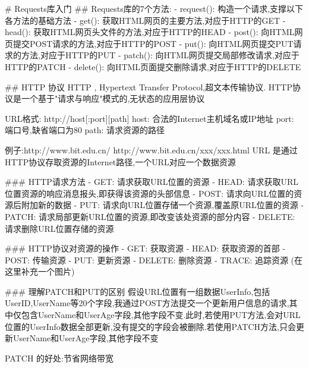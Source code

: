 # Requests库入门
## Requests库的7个方法:
- request(): 构造一个请求,支撑以下各方法的基础方法
- get(): 获取HTML网页的主要方法,对应于HTTP的GET
- head(): 获取HTML网页头文件的方法,对应于HTTP的HEAD
- post(): 向HTML网页提交POST请求的方法,对应于HTTP的POST
- put(): 向HTML网页提交PUT请求的方法,对应于HTTP的PUT
- patch(): 向HTML网页提交局部修改请求,对应于HTTP的PATCH
- delete(): 向HTML页面提交删除请求,对应于HTTP的DELETE

## HTTP 协议
HTTP , Hypertext Transfer Protocol,超文本传输协议.
HTTP协议是一个基于"请求与响应"模式的,无状态的应用层协议

URL格式: http://host[:port][path]
host: 合法的Internet主机域名或IP地址
port: 端口号,缺省端口为80
path: 请求资源的路径

例子:http://www.bit.edu.cn/  http://www.bit.edu.cn/xxx/xxx.html
URL 是通过HTTP协议存取资源的Internet路径,一个URL对应一个数据资源

### HTTP请求方法
- GET: 请求获取URL位置的资源
- HEAD: 请求获取URL位置资源的响应消息报头,即获得该资源的头部信息
- POST: 请求向URL位置的资源后附加新的数据
- PUT: 请求向URL位置存储一个资源,覆盖原URL位置的资源
- PATCH: 请求局部更新URL位置的资源,即改变该处资源的部分内容
- DELETE: 请求删除URL位置存储的资源

### HTTP协议对资源的操作
- GET: 获取资源
- HEAD: 获取资源的首部
- POST: 传输资源
- PUT: 更新资源
- DELETE: 删除资源
- TRACE: 追踪资源
(在这里补充一个图片)

### 理解PATCH和PUT的区别
假设URL位置有一组数据UserInfo,包括UserID,UserName等20个字段,我通过POST方法提交一个更新用户信息的请求,其中仅包含UserName和UserAge字段,其他字段不变.此时,若使用PUT方法,会对URL位置的UserInfo数据全部更新,没有提交的字段会被删除.若使用PATCH方法,只会更新UserName和UserAge字段,其他字段不变

PATCH 的好处:节省网络带宽

